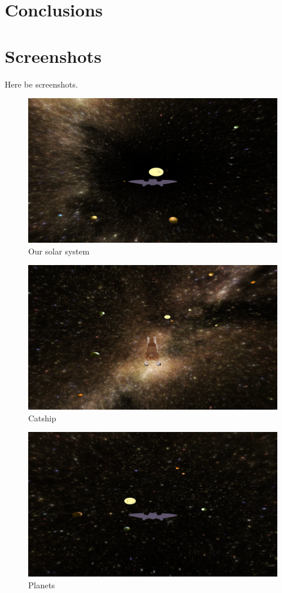 \documentclass[a4paper,12pt]{article}
\begin{document}
\section{Conclusions}

\section{Screenshots}
Here be screenshots.
\begin{figure}[h!]
        \centering
        \includegraphics[width=1.2\textwidth]{bild/our.png}
        \caption{Our solar system}
        \label{fig:our}
\end{figure}
\begin{figure}[h!]
        \centering
        \includegraphics[width=1.2\textwidth]{bild/cat.png}
        \caption{Catship}
        \label{fig:cat}
\end{figure}
\begin{figure}[h!]
        \centering
        \includegraphics[width=1.2\textwidth]{bild/planets.png}
        \caption{Planets}
        \label{fig:planets}
\end{figure}
\end{document}
